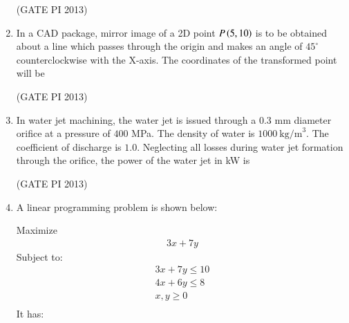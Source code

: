 \documentclass[journal,12pt,onecolumn]{IEEEtran}
\theoremstyle{remark}
\begin{document}
\begin{enumerate}
\hfill (GATE PI 2013)


\item In a CAD package, mirror image of a 2D point $P\left(5,10\right)$ is to be obtained about a line which passes through the origin and makes an angle of $45^\circ$ counterclockwise with the X-axis. The coordinates of the transformed point will be
\begin{enumerate}
\end{enumerate}

\hfill (GATE PI 2013)

\item In water jet machining, the water jet is issued through a $0.3$ mm diameter orifice at a pressure of $400$ MPa. The density of water is $1000 \ \text{kg/m}^3$. The coefficient of discharge is $1.0$. Neglecting all losses during water jet formation through the orifice, the power of the water jet in kW is
\begin{enumerate}
\end{enumerate}

\hfill (GATE PI 2013)

\item A linear programming problem is shown below: 

Maximize 
\begin{align*}
3x + 7y
\end{align*}
Subject to:  
\begin{align*}
3x + 7y \leq 10 \\
4x + 6y \leq 8  \\
x, y \geq 0 \\
\end{align*}
It has:
\begin{enumerate}
\end{enumerate}


\end{enumerate}
\end{document}
